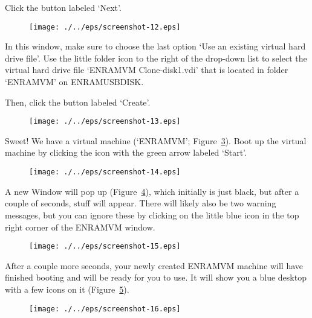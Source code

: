 Click the button labeled `Next'.

\begin{figure}[ht]
  \centering
    \texttt{[image: ./../eps/screenshot-12.eps]}
  \caption{}
  \label{fig:screenshot-12}
\end{figure}


In this window, make sure to choose the last option `Use an existing virtual hard drive file'. Use the little folder icon to the right of the drop-down list to select the virtual hard drive file `ENRAMVM Clone-disk1.vdi' that is located in folder `ENRAMVM' on ENRAMUSBDISK.

Then, click the button labeled `Create'.

\begin{figure}[ht]
  \centering
    \texttt{[image: ./../eps/screenshot-13.eps]}
  \caption{}
  \label{fig:screenshot-13}
\end{figure}
\clearpage

Sweet! We have a virtual machine (`ENRAMVM'; Figure~\ref{fig:screenshot-14}). Boot up the virtual machine by clicking the icon with the green arrow labeled `Start'.

\begin{figure}[ht]
  \centering
    \texttt{[image: ./../eps/screenshot-14.eps]}
  \caption{}
  \label{fig:screenshot-14}
\end{figure}


A new Window will pop up (Figure~\ref{fig:screenshot-15}), which initially is just black, but after a couple of seconds, stuff will appear. There will likely also be two warning messages, but you can ignore these by clicking on the little blue icon in the top right corner of the ENRAMVM window.


\begin{figure}[ht]
  \centering
    \texttt{[image: ./../eps/screenshot-15.eps]}
  \caption{}
  \label{fig:screenshot-15}
\end{figure}
\clearpage

After a couple more seconds, your newly created ENRAMVM machine will have finished booting and will be ready for you to use. It will show you a blue desktop with a few icons on it (Figure~\ref{fig:screenshot-16}).

\begin{figure}[ht]
  \centering
    \texttt{[image: ./../eps/screenshot-16.eps]}
  \caption{}
  \label{fig:screenshot-16}
\end{figure}


